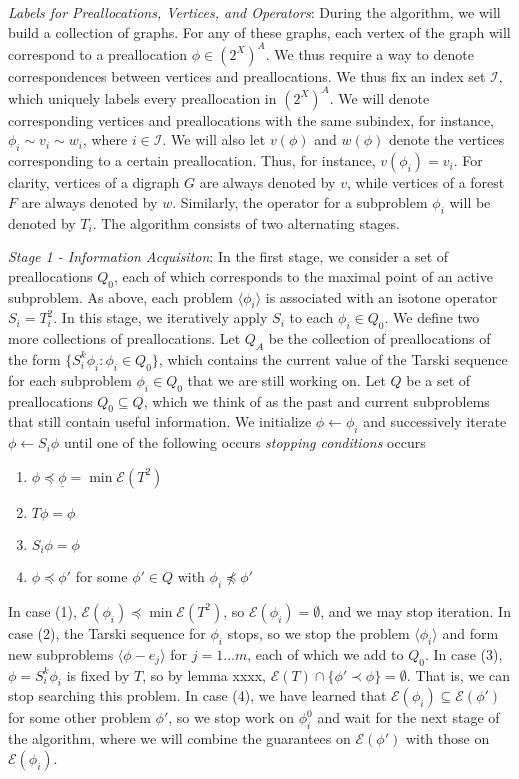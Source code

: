\documentclass[11pt,reqno]{amsart}
\theoremstyle{definition}
\numberwithin{equation}{section}
\newcommand{\ul}{\underline}
\newcommand{\lag}{\langle}
\newcommand{\rag}{\rangle}
\newcommand{\pre}{\phi}
\newcommand{\prealloc}{(2^X)^A}
\newcommand{\sub}{\subseteq}
\newcommand{\fix}{\mathcal{E}}
\newcommand{\peq}{\preceq}
\newcommand{\pe}{\prec}
\newcommand{\acto}{Q_0}
\newcommand{\acta}{Q_A}
\newcommand{\preo}{\pre^{0}}
\begin{document}
\emph{Labels for Preallocations, Vertices, and Operators}:
During the algorithm, we will build a collection of graphs.
For any of these graphs, each vertex of the graph will correspond to a preallocation $\pre \in \prealloc$.
We thus require a way to denote correspondences between vertices and preallocations. 
We thus fix an index set $\mathcal{I}$, which uniquely labels every preallocation in $\prealloc$. 
We will denote corresponding vertices and preallocations with the same subindex, for instance, $\pre_i \sim v_i \sim w_i$, where $i \in \mathcal{I}$. 
We will also let $v(\pre)$ and $w(\pre)$ denote the vertices corresponding to a certain preallocation. 
Thus, for instance, $v(\pre_i) = v_i$.
For clarity, vertices of a digraph $G$ are always denoted by $v$, while vertices of a forest $F$ are always denoted by $w$.
Similarly, the operator for a subproblem $\pre_i$ will be denoted by $T_i$.
The algorithm consists of two alternating stages. 

\emph{Stage 1 - Information Acquisiton}: In the first stage, we consider a set of preallocations $\acto$, each of which corresponds to the maximal point of an active subproblem. 
As above, each problem $\lag \pre_i \rag$ is associated with an isotone operator $S_i = T_i^2$.
In this stage, we iteratively apply $S_i$ to each $\pre_i \in \acto$.
We define two more collections of preallocations.
Let $\acta$ be the collection of preallocations of the form $\{S_i^k \pre_i: \pre_i \in \acto\}$, which contains the current value of the Tarski sequence for each subproblem $\pre_i \in \acto$ that we are still working on.
Let $Q$ be a set of preallocations $\acto \sub Q$, which we think of as the past and current subproblems that still contain useful information.  
We initialize $\pre \leftarrow \pre_i$ and successively iterate $\pre \leftarrow S_i \pre$ until one of the following occurs \emph{stopping conditions} occurs
\begin{enumerate}
\item $\pre \peq \ul{\pre} = \min \fix(T^2)$ 
\item $T \pre = \pre$
\item $S_i \pre = \pre$
\item $\pre \peq \pre'$ for some $\pre' \in Q$ with $\pre_i \not \peq \pre'$ 
\end{enumerate} 

In case (1), $\fix(\pre_i) \peq \min \fix(T^2)$, so $\fix(\pre_i) = \emptyset$, and we may stop iteration. 
In case (2), the Tarski sequence for $\pre_i$ stops, so we stop the problem $\lag \pre_i \rag$ and form new subproblems $\lag \pre - e_j \rag$ for $j = 1 \hdots m$, each of which we add to $\acto$.  
In case (3), $\pre = S_i^k \pre_i$ is fixed by $T$, so by lemma xxxx, $\fix(T) \cap \{\pre' \pe \pre \} = \emptyset$.
That is, we can stop searching this problem.
In case (4), we have learned that $\fix(\pre_i) \sub \fix(\pre')$ for some other problem $\pre'$, so we stop work on $\preo_i$ and wait for the next stage of the algorithm, where we will combine the guarantees on $\fix(\pre')$ with those on $\fix(\pre_i)$.
\end{document}
